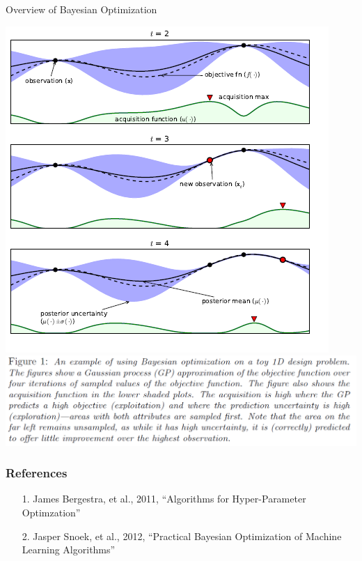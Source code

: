 \documentclass{beamer}
\begin{document}
%
\begin{frame}{Overview of Bayesian Optimization}
\begin{center}
\includegraphics[width=.5\textwidth]{overview_1}
\includegraphics[width=.5\textwidth]{overview_2}
\end{center}
\end{frame}
%
\begin{frame}
\frametitle{References}
\begin{enumerate}
\item[1.]
James Bergestra, et al., 2011, ``Algorithms for Hyper-Parameter Optimzation''
\item[2.]
Jasper Snoek, et al., 2012, ``Practical Bayesian Optimization of Machine Learning Algorithms''
\end{enumerate}
\end{frame}

%
\end{document}
